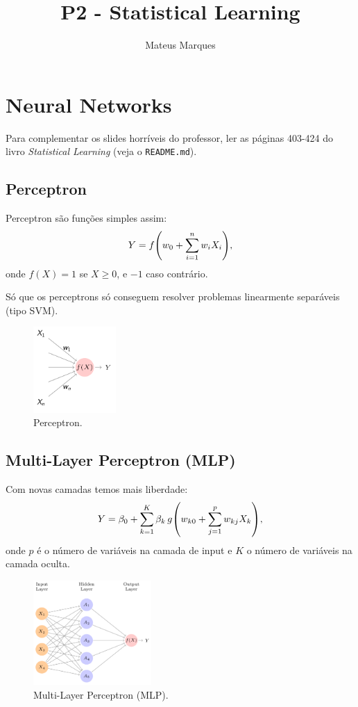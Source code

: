 \documentclass[a4paper,fleqn,12pt]{article}
\title{\Huge{\textbf{P2 - Statistical Learning}}}
\author{Mateus Marques}
\begin{document}
\maketitle

\section{Neural Networks}

Para complementar os slides horríveis do professor, ler as páginas 403-424 do livro \textit{Statistical Learning} (veja o \texttt{README.md}).

\subsection{Perceptron}

Perceptron são funções simples assim:
$$
Y = f\qty(w_0 + \sum_{i=1}^{n} w_i X_i),
$$
onde $f(X) = 1$ se $X \geq 0$, e $-1$ caso contrário.

Só que os perceptrons só conseguem resolver problemas linearmente separáveis (tipo SVM).
\begin{figure}[H]
\centering
\includegraphics[width=0.28\textwidth]{fig/perceptron.png}
\caption{Perceptron.}
\label{fig:perceptron}
\end{figure}

\subsection{Multi-Layer Perceptron (MLP)}

Com novas camadas temos mais liberdade:
$$
Y =  \beta_0 + \sum_{k=1}^{K} \beta_k \, g\qty(w_{k0} + \sum_{j=1}^{p} w_{kj} X_k),
$$
onde $p$ é o número de variáveis na camada de input e $K$ o número de variáveis na camada oculta.
\begin{figure}[H]
\centering
\includegraphics[width=0.4\textwidth]{fig/mlp.png}
\caption{Multi-Layer Perceptron (MLP).}
\label{fig:mlp}
\end{figure}
\end{document}
